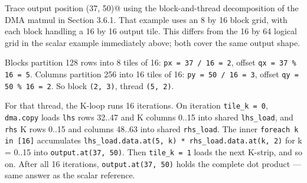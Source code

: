 Trace output position \co@(37, 50)@ using the block-and-thread decomposition of the DMA matmul in Section 3.6.1. That example uses an 8 by 16 block grid, with each block handling a 16 by 16 output tile. This differs from the 16 by 64 logical grid in the scalar example immediately above; both cover the same output shape.

Blocks partition 128 rows into 8 tiles of 16: \texttt{px = 37 /\allowbreak{} 16 = 2}, offset \texttt{qx = 37 \% 16 = 5}. Columns partition 256 into 16 tiles of 16: \texttt{py = 50 /\allowbreak{} 16 = 3}, offset \texttt{qy = 50 \% 16 = 2}. So block \texttt{(2, 3)}, thread \texttt{(5, 2)}.

For that thread, the K-loop runs 16 iterations. On iteration \texttt{tile\_k = 0}, \texttt{dma.copy} loads \texttt{lhs} rows 32..47 and K columns 0..15 into shared \texttt{lhs\_load}, and \texttt{rhs} K rows 0..15 and columns 48..63 into shared \texttt{rhs\_load}. The inner \texttt{foreach k in [16]} accumulates \texttt{lhs\_\allowbreak{}load.\allowbreak{}data.\allowbreak{}at(5, k) * rhs\_\allowbreak{}load.\allowbreak{}data.\allowbreak{}at(k, 2)} for k = 0..15 into \texttt{output.\allowbreak{}at(37, 50)}. Then \texttt{tile\_k = 1} loads the next K-strip, and so on. After all 16 iterations, \texttt{output.\allowbreak{}at(37, 50)} holds the complete dot product --- same answer as the scalar reference.
